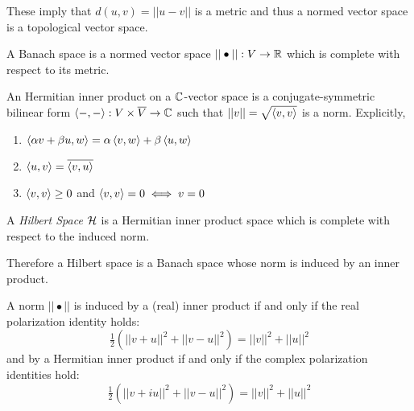 \documentclass[12pt]{article}
\begin{document}
\begin{rmk}
These imply that $d(u,v) = ||u - v||$ is a metric and thus a normed vector space is a topological vector space.
\end{rmk}

\begin{defn}
A Banach space is a normed vector space $|| \bullet || : V \to \mathbb{R}$ which is complete with respect to its metric.
\end{defn}

\begin{defn}
An Hermitian inner product on a $\mathbb{C}$-vector space is a conjugate-symmetric bilinear form $\left< - , - \right> : V \times \overline{V} \to \mathbb{C}$ such that $|| v || = \sqrt{\left< v , v \right>}$ is a norm. Explicitly,
\begin{enumerate}
\item $\left< \alpha v + \beta u , w \right> = \alpha \left< v , w \right> + \beta \left< u , w \right>$
\item $\left< u , v \right> = \overline{\left< v , u \right>}$
\item $\left< v , v \right> \ge 0$ and $\left< v , v \right> = 0 \iff v = 0$
\end{enumerate}
\end{defn}

\begin{defn}
A \textit{Hilbert Space} $\mathcal{H}$ is a Hermitian inner product space which is complete with respect to the induced norm. 
\end{defn}

\begin{rmk}
Therefore a Hilbert space is a Banach space whose norm is induced by an inner product.
\end{rmk}


\begin{prop}
A norm $|| \bullet ||$ is induced by a (real) inner product if and only if the real polarization identity holds:
\[ \tfrac{1}{2} \left( || v + u ||^2 + || v - u ||^2 \right) = || v ||^2 + || u ||^2 \]
and by a Hermitian inner product if and only if the complex polarization identities hold:
\[ \tfrac{1}{2} \left( || v + i u ||^2 + || v - u ||^2 \right) = || v ||^2 + || u ||^2 \]
\end{prop}
\end{document}
